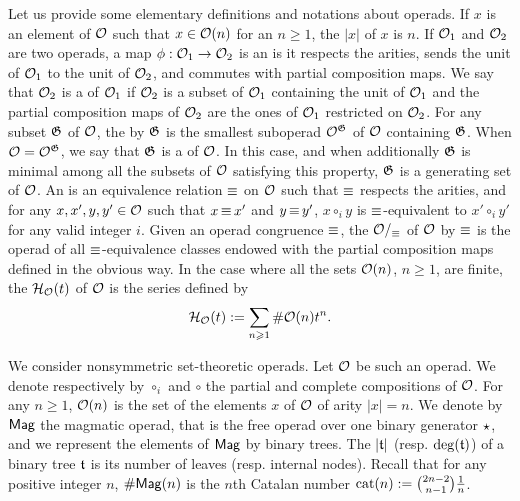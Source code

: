 Let us provide some elementary definitions and notations about operads.
If $x$ is an element of $\mathcal{O}$ such that $x \in \mathcal{O}(n)$ for an
$n \geq 1$, the  $|x|$ of $x$ is $n$. If $\mathcal{O}_1$ and
$\mathcal{O}_2$ are two operads, a map $\phi : \mathcal{O}_1 \to \mathcal{O}_2$ is an
 is it respects the arities, sends the unit of
$\mathcal{O}_1$ to the unit of $\mathcal{O}_2$, and commutes with partial composition
maps. We say that $\mathcal{O}_2$ is a  of $\mathcal{O}_1$ if $\mathcal{O}_2$
is a subset of $\mathcal{O}_1$ containing the unit of $\mathcal{O}_1$ and the partial
composition maps of $\mathcal{O}_2$ are the ones of $\mathcal{O}_1$ restricted on
$\mathcal{O}_2$. For any subset $\mathfrak{G}$ of $\mathcal{O}$, the
 by $\mathfrak{G}$ is the smallest suboperad
$\mathcal{O}^{\mathfrak{G}}$ of $\mathcal{O}$ containing $\mathfrak{G}$. When
$\mathcal{O} = \mathcal{O}^{\mathfrak{G}}$, we say that $\mathfrak{G}$ is a
 of $\mathcal{O}$. In this case, and when additionally
$\mathfrak{G}$ is minimal among all the subsets of $\mathcal{O}$ satisfying
this property, $\mathfrak{G}$ is a  generating set of
$\mathcal{O}$. An  is an equivalence relation
$\operatorname{\equiv}$ on $\mathcal{O}$ such that $\operatorname{\equiv}$ respects the arities, and
for any $x, x', y, y' \in \mathcal{O}$ such that
$x \operatorname{\equiv} x'$ and $y \operatorname{\equiv} y'$, $x \circ_i y$ is $\operatorname{\equiv}$-equivalent to
$x' \circ_i y'$ for any valid integer $i$. Given an operad congruence
$\operatorname{\equiv}$, the  $\mathcal{O}/_{\operatorname{\equiv}}$ of $\mathcal{O}$ by
$\operatorname{\equiv}$ is the operad of all $\operatorname{\equiv}$-equivalence classes endowed
with the partial composition maps defined in the obvious way.
In the case where all the sets $\mathcal{O}(n)$, $n \geq 1$, are finite, the
 $\mathcal{H}_{\mathcal{O}}(t)$ of $\mathcal{O}$ is the series
defined by
\begin{equation}
    \mathcal{H}_{\mathcal{O}}(t) := \sum_{n \geqslant 1} \# \mathcal{O}(n) t^n.
\end{equation}


We consider nonsymmetric set-theoretic operads. Let $\mathcal{O}$ be such an
operad. We denote respectively by $\circ_i$ and $\circ$ the partial and
complete compositions of $\mathcal{O}$. For any $n \geq 1$, $\mathcal{O}(n)$ is the
set of the elements $x$ of $\mathcal{O}$ of arity $|x| = n$. We denote
by $\mathsf{Mag}$ the magmatic operad, that is the free operad over one binary
generator $\operatorname{\star}$, and we represent the elements of $\mathsf{Mag}$ by binary
trees. The  $|\mathfrak{t}|$ (resp.  $\mathrm{deg}(\mathfrak{t})$) of a
binary tree $\mathfrak{t}$ is its number of leaves (resp. internal nodes).
Recall that for any positive integer $n$,
$\# \mathsf{Mag}(n)$ is the $n$th Catalan number
$\mathrm{cat}(n) := \binom{2n - 2}{n - 1}\frac{1}{n}$.
\medbreak

